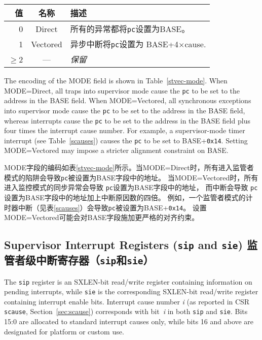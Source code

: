 \begin{table*}[h!]
\begin{center}
\begin{tabular}{|r|c|l|}
\hline
值 & 名称 & 描述 \\
\hline
0      & Direct   & 所有的异常都将{\tt pc}设置为BASE。 \\
1      & Vectored & 异步中断将{\tt pc}设置为 BASE+4$\times$cause. \\
$\ge$2 & --- & {\em 保留} \\
\hline
\end{tabular}
\end{center}
\caption{{\tt stvec} MODE 域的编码}
\label{stvec-mode}
\end{table*}

The encoding of the MODE field is shown in Table~\ref{stvec-mode}.  When
MODE=Direct, all traps into supervisor mode cause the {\tt pc} to be set to the
address in the BASE field.  When MODE=Vectored, all synchronous exceptions
into supervisor mode cause the {\tt pc} to be set to the address in the BASE
field, whereas interrupts cause the {\tt pc} to be set to the address in
the BASE field plus four times the interrupt cause number.  For example,
a supervisor-mode timer interrupt (see Table~\ref{scauses}) causes the {\tt pc}
to be set to BASE+{\tt 0x14}.
Setting MODE=Vectored may impose a stricter alignment constraint on BASE.

MODE字段的编码如表\ref{stvec-mode}所示。当MODE=Direct时，所有进入监管者模式的陷阱会导致{\tt pc}被设置为BASE字段中的地址。
当MODE=Vectored时，所有进入监控模式的同步异常会导致 {\tt pc}设置为BASE字段中的地址，
而中断会导致 {\tt pc}设置为BASE字段中的地址加上中断原因数的四倍。
例如，一个监管者模式的计时器中断（见表\ref{scauses}）会导致{\tt pc}被设置为BASE+{\tt 0x14}。
设置MODE=Vectored可能会对BASE字段施加更严格的对齐约束。

\subsection{Supervisor Interrupt Registers ({\tt sip} and {\tt sie}) 监管者级中断寄存器（{\tt sip}和{\tt sie}）}

The {\tt sip} register is an SXLEN-bit read/write register containing
information on pending interrupts, while {\tt sie} is the corresponding
SXLEN-bit read/write register containing interrupt enable bits.
Interrupt cause number \textit{i} (as reported in CSR {\tt scause},
Section~\ref{sec:scause}) corresponds with bit~\textit{i} in both
{\tt sip} and {\tt sie}.
Bits 15:0 are allocated to standard interrupt causes only, while bits 16
and above are designated for platform or custom use.

